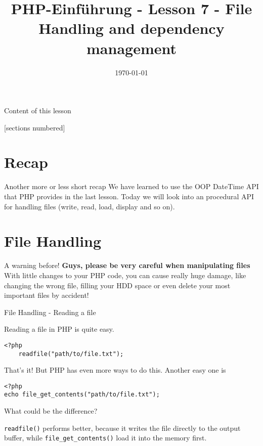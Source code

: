 


\newcommand{\topic}{
	PHP-Einführung - Lesson 7 - File Handling and dependency management
}

\title{\topic}
\date{\today}



\maketitle

\begin{frame}{Content of this lesson}

	[sections numbered]
	\tableofcontents

\end{frame}

\section{Recap}

\begin{frame}{Another more or less short recap}
	We have learned to use the OOP DateTime API that PHP provides in the last lesson. Today we will look into an procedural API for handling files (write, read, load, display and so on).
\end{frame}

\section{File Handling}

\begin{frame}{A warning before!}
	\textbf{Guys, please be very careful when manipulating files}\pause
	With little changes to your PHP code, you can cause really huge damage, like changing the wrong file, filling your HDD space or even delete your most important files by accident!
\end{frame}

\begin{frame}[fragile]{File Handling - Reading a file}

Reading a file in PHP is quite easy. \pause
\begin{lstlisting}
<?php
	readfile("path/to/file.txt");
\end{lstlisting} \pause
That's it! But PHP has even more ways to do this. Another easy one is
\begin{lstlisting}
<?php
echo file_get_contents("path/to/file.txt");
\end{lstlisting} \pause

What could be the difference?\pause

\texttt{readfile()} performs better, because it writes the file directly to the output buffer, while \texttt{file\_get\_contents()} load it into the memory first.

\end{frame}

